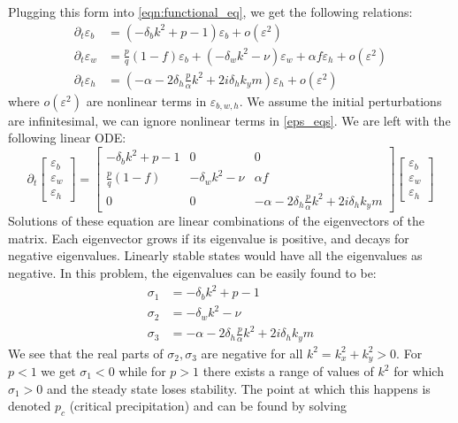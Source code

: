 \documentclass{article}
\numberwithin{equation}{section}
\begin{document}
Plugging this form into \ref{eqn:functional_eq}, we get the following relations:
\begin{align}\label{eps_eqs}
    \partial_t \varepsilon_b &= (-\delta_b k^2+p - 1)\varepsilon_b + o(\varepsilon^2) \\
    \partial_t \varepsilon_w &= \frac{p}{q}(1-f)\varepsilon_b + (-\delta_wk^2-\nu)\varepsilon_w +\alpha f\varepsilon_h + o(\varepsilon^2) \\
    \partial_t \varepsilon_h &= (-\alpha -2\delta_h \frac{p}{\alpha} k^2 +2i\delta_hk_ym) \varepsilon_h + o(\varepsilon^2)
\end{align}
where $o(\varepsilon^2)$ are nonlinear terms in $\varepsilon_{b,w,h}$. We assume the initial perturbations are infinitesimal, we can ignore nonlinear terms in \ref{eps_eqs}. We are left with the following linear ODE:
\begin{equation}
    \partial_t \begin{bmatrix}
        \varepsilon_b \\ \varepsilon_w \\ \varepsilon_h
    \end{bmatrix} = \begin{bmatrix}
        -\delta_b k^2+p - 1 & 0 & 0 \\
        \frac{p}{q}(1-f) & -\delta_wk^2-\nu & \alpha f \\
        0 & 0 & -\alpha -2\delta_h \frac{p}{\alpha} k^2 +2i\delta_hk_ym
    \end{bmatrix} \begin{bmatrix}
        \varepsilon_b \\ \varepsilon_w \\ \varepsilon_h
    \end{bmatrix}
\end{equation}
Solutions of these equation are linear combinations of the eigenvectors of the matrix. Each eigenvector grows if its eigenvalue is positive, and decays for negative eigenvalues. Linearly stable states would have all the eigenvalues as  negative. In this problem, the eigenvalues can be easily found to be:
\begin{align}
    \sigma_1 &= -\delta_b k^2+p - 1 \label{eq:sigma1}\\
    \sigma_2 &= -\delta_w k^2 -\nu \\
    \sigma_3 &= -\alpha -2\delta_h \frac{p}{\alpha} k^2 +2i\delta_hk_ym
\end{align}
We see that the real parts of $\sigma_2,\sigma_3$ are negative for all $k^2 = k_x^2+k_y^2>0$. For $p<1$ we get $\sigma_1<0$  while for $p>1$  there exists a range of values of $k^2$  for which $\sigma_1>0$ and the steady state loses stability. The point at which this happens is denoted $p_c$ (critical precipitation) and can be found by solving
\end{document}
